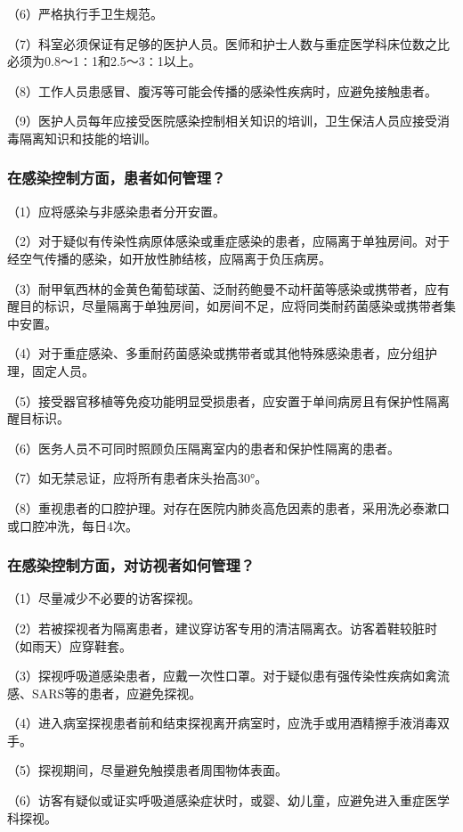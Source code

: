 （6）严格执行手卫生规范。

（7）科室必须保证有足够的医护人员。医师和护士人数与重症医学科床位数之比必须为0.8～1∶1和2.5～3∶1以上。

（8）工作人员患感冒、腹泻等可能会传播的感染性疾病时，应避免接触患者。

（9）医护人员每年应接受医院感染控制相关知识的培训，卫生保洁人员应接受消毒隔离知识和技能的培训。

\subsubsection{在感染控制方面，患者如何管理？}

（1）应将感染与非感染患者分开安置。

（2）对于疑似有传染性病原体感染或重症感染的患者，应隔离于单独房间。对于经空气传播的感染，如开放性肺结核，应隔离于负压病房。

（3）耐甲氧西林的金黄色葡萄球菌、泛耐药鲍曼不动杆菌等感染或携带者，应有醒目的标识，尽量隔离于单独房间，如房间不足，应将同类耐药菌感染或携带者集中安置。

（4）对于重症感染、多重耐药菌感染或携带者或其他特殊感染患者，应分组护理，固定人员。

（5）接受器官移植等免疫功能明显受损患者，应安置于单间病房且有保护性隔离醒目标识。

（6）医务人员不可同时照顾负压隔离室内的患者和保护性隔离的患者。

（7）如无禁忌证，应将所有患者床头抬高30°。

（8）重视患者的口腔护理。对存在医院内肺炎高危因素的患者，采用洗必泰漱口或口腔冲洗，每日4次。

\subsubsection{在感染控制方面，对访视者如何管理？}

（1）尽量减少不必要的访客探视。

（2）若被探视者为隔离患者，建议穿访客专用的清洁隔离衣。访客着鞋较脏时（如雨天）应穿鞋套。

（3）探视呼吸道感染患者，应戴一次性口罩。对于疑似患有强传染性疾病如禽流感、SARS等的患者，应避免探视。

（4）进入病室探视患者前和结束探视离开病室时，应洗手或用酒精擦手液消毒双手。

（5）探视期间，尽量避免触摸患者周围物体表面。

（6）访客有疑似或证实呼吸道感染症状时，或婴、幼儿童，应避免进入重症医学科探视。

